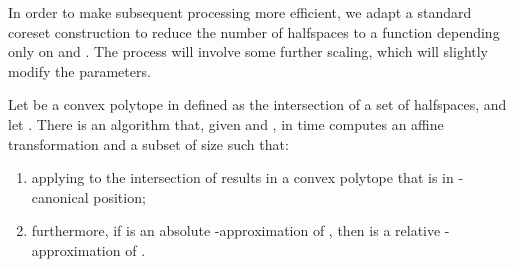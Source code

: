 \documentclass[11pt]{article}   \usepackage[letterpaper,hmargin=2.1cm,vmargin=3cm]{geometry}
\begin{document}
In order to make subsequent processing more efficient, we adapt a standard coreset construction to reduce the number of halfspaces to a function depending only on  and . The process will involve some further scaling, which will slightly modify the parameters.

\begin{lemma} \label{lem:precondition-2}
Let  be a convex polytope in  defined as the intersection of a set  of  halfspaces, and let . There is an algorithm that, given  and , in  time computes an affine transformation  and a subset  of size  such that: 
\begin{enumerate}
\setlength{\itemsep}{-0.5ex}\setlength{\parsep}{0pt}\item[] applying  to the intersection of  results in a convex polytope  that is in -canonical position;

\item[] furthermore, if  is an absolute -approximation of , then  is a relative -approximation of .
\end{enumerate}
\end{lemma}
\end{document}
